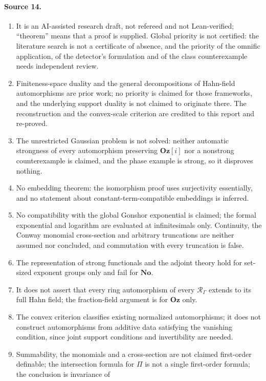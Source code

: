 \documentclass[11pt,oneside]{article}
\numberwithin{equation}{section}
\theoremstyle{definition}
\theoremstyle{remark}
\newcommand{\No}{\mathbf{No}}
\newcommand{\Oz}{\mathbf{Oz}}
\newcommand{\Og}{\mathbf{Oz}[i]}
\begin{document}
\paragraph{Source 14.}
\begin{enumerate}[itemsep=1pt]
\item It is an AI-assisted research draft, not refereed and not Lean-verified; ``theorem'' means
that a proof is supplied. Global priority is not certified: the literature search is not a
certificate of absence, and the priority of the omnific application, of the detector's
formulation and of the class counterexample needs independent review.
\item Finiteness-space duality \cite{BCJS} and the general decompositions of Hahn-field
automorphisms \cite{KS,KKS} are prior work; no priority is claimed for those frameworks, and the
underlying support duality is not claimed to originate there. The reconstruction and the
convex-scale criterion are credited to this report and re-proved.
\item The unrestricted Gaussian problem is not solved: neither automatic strongness of every
automorphism preserving $\Og$ nor a nonstrong counterexample is claimed, and the phase example is
strong, so it disproves nothing.
\item No embedding theorem: the isomorphism proof uses surjectivity essentially, and no statement
about constant-term-compatible embeddings is inferred.
\item No compatibility with the global Gonshor exponential is claimed; the formal exponential and
logarithm are evaluated at infinitesimals only. Continuity, the Conway monomial cross-section and
arbitrary truncations are neither assumed nor concluded, and commutation with every truncation is
false.
\item The representation of strong functionals and the adjoint theory hold for set-sized exponent
groups only and fail for $\No$.
\item It does not assert that every ring automorphism of every $\mathcal R_\Gamma$ extends to its
full Hahn field; the fraction-field argument is for $\Oz$ only.
\item The convex criterion classifies existing normalized automorphisms; it does not construct
automorphisms from additive data satisfying the vanishing condition, since joint support conditions
and invertibility are needed.
\item Summability, the monomials and a cross-section are not claimed first-order definable; the
intersection formula for $\Pi$ is not a single first-order formula; the conclusion is invariance of

\end{enumerate}
\end{document}
